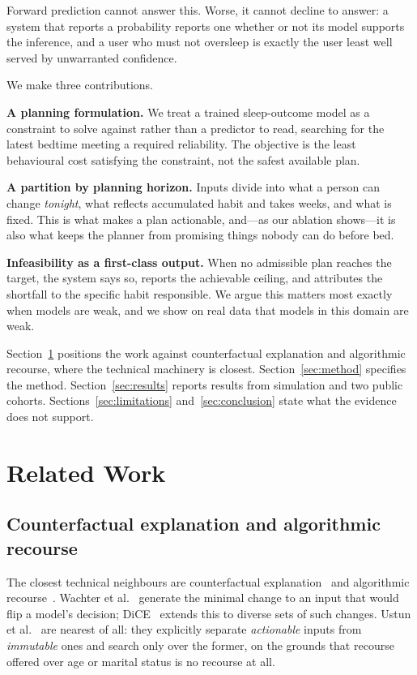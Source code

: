 \documentclass[conference]{IEEEtran}
\begin{document}
Forward prediction cannot answer this. Worse, it cannot decline to answer: a
system that reports a probability reports one whether or not its model supports
the inference, and a user who must not oversleep is exactly the user least well
served by unwarranted confidence.

We make three contributions.

\textbf{A planning formulation.} We treat a trained sleep-outcome model as a
constraint to solve against rather than a predictor to read, searching for the
latest bedtime meeting a required reliability. The objective is the least
behavioural cost satisfying the constraint, not the safest available plan.

\textbf{A partition by planning horizon.} Inputs divide into what a person can
change \emph{tonight}, what reflects accumulated habit and takes weeks, and what
is fixed. This is what makes a plan actionable, and---as our ablation
shows---it is also what keeps the planner from promising things nobody can do
before bed.

\textbf{Infeasibility as a first-class output.} When no admissible plan reaches
the target, the system says so, reports the achievable ceiling, and attributes
the shortfall to the specific habit responsible. We argue this matters most
exactly when models are weak, and we show on real data that models in this
domain are weak.

Section~\ref{sec:related} positions the work against counterfactual explanation
and algorithmic recourse, where the technical machinery is closest.
Section~\ref{sec:method} specifies the method. Section~\ref{sec:results} reports
results from simulation and two public cohorts. Sections~\ref{sec:limitations}
and~\ref{sec:conclusion} state what the evidence does not support.

\section{Related Work}
\label{sec:related}

\subsection{Counterfactual explanation and algorithmic recourse}

The closest technical neighbours are counterfactual explanation~\cite{wachter}
and algorithmic recourse~\cite{ustun,dice}. Wachter et al.~\cite{wachter}
generate the minimal change to an input that would flip a model's decision;
DiCE~\cite{dice} extends this to diverse sets of such changes. Ustun et
al.~\cite{ustun} are nearest of all: they explicitly separate \emph{actionable}
inputs from \emph{immutable} ones and search only over the former, on the
grounds that recourse offered over age or marital status is no recourse at all.
\end{document}

